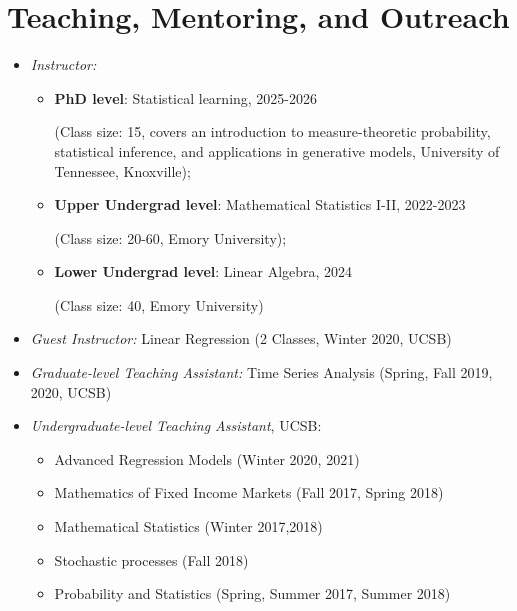 \documentclass[11pt,a4paper,roman]{moderncv}
\begin{document}
\section{Teaching, Mentoring, and Outreach}
\begin{itemize}
\item \emph{Instructor:} 
\begin{itemize}
\item \textbf{PhD level}: Statistical learning, 2025-2026

(Class size: 15, covers an introduction to measure-theoretic probability, statistical inference, and applications in generative models, University of Tennessee, Knoxville);

    \item \textbf{Upper Undergrad level}: Mathematical Statistics I-II, 2022-2023
    
    (Class size: 20-60, Emory University); 
    \item \textbf{Lower Undergrad level}: Linear Algebra, 2024
    
    (Class size: 40, Emory University)
\end{itemize}
\item \emph{Guest Instructor:} Linear Regression (2 Classes, Winter 2020, UCSB)

\vspace{1pt}

\item \emph{Graduate-level Teaching Assistant:}   Time Series Analysis (Spring, Fall 2019, 2020, UCSB) 

\vspace{1pt}

\item \emph{Undergraduate-level Teaching Assistant}, UCSB: 

    \vspace{1pt}
    
\begin{itemize}
\item Advanced Regression Models (Winter 2020, 2021) 

\item Mathematics of Fixed Income Markets (Fall 2017, Spring 2018)

\item Mathematical Statistics (Winter 2017,2018)
\item Stochastic processes (Fall 2018)
\item Probability and Statistics (Spring, Summer 2017, Summer 2018) 


\end{itemize}
\end{itemize}
\end{document}
